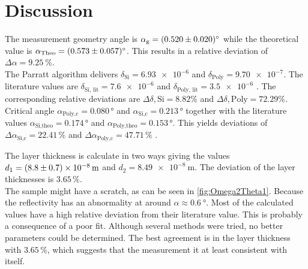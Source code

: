 \section{Discussion}
\label{sec:Diskussion}


The measurement geometry angle is $\alpha_\text{g} = \SI{0.520 \pm 0.020}{\degree}$ while the theoretical value is $\alpha_\text{Theo}  = \SI{0.573 \pm 0.057}{\degree}$.
This results in a relative deviation of $\Delta\alpha = \SI{9.25}{\%}$.\\
The Parratt algorithm delivers $\delta_{\text{Si}}   =  \num{6.93e-6}$ and $\delta_\text{Poly}  =  \num{9.70e-7}$.
The literature values are $\delta_{\text{Si, lit}} = \num{7.6e-6}$ and $\delta_{\text{Poly, lit}} = \num{3.5e-6}$ \cite{v44}.
The corresponding relative deviations are $\Delta{\delta, \text{Si}} = \num{8.82}{\%}$ and $\Delta{\delta, \text{Poly}} = \num{72.29}{\%}$.\\
Critical angle $\alpha_{\text{Poly}, \text{c}} = 0.080 \, \unit{\degree}$ and $\alpha_{\text{Si}, \text{c}} = 0.213\, \unit{\degree}$ together with the literature values 
$\alpha_{\text{Si}, \text{theo}} = 0.174 \, \unit{\degree}$ and $\alpha_{\text{Poly}, \text{theo}} = 0.153 \, \unit{\degree}$.
This yields deviations of $\Delta{\alpha_{\text{Si}, \text{c}}} = 22.41\,\%$ and $\Delta{\alpha_{\text{Poly}, \text{c}}} = 47.71\,\%$ .


The layer thickness is calculate in two ways giving the values $d_1 = \SI{8.8 \pm 0.7e-08}{\meter}$ and $d_2 = \SI{8.49e-8}{\meter}$.
The deviation of the layer thicknesses is $3.65\, \%$.\\

The sample might have a scratch, as can be seen in \autoref{fig:Omega2Theta1}. Because the reflectivity has an abnormality at around $\alpha \approx \SI{0.6}{\degree}$.
Most of the calculated values have a high relative deviation from their literature value. This is probably a consequence of a poor fit.
Although several methods were tried, no better parameters could be determined. The best agreement is in the layer thickness with $3.65\, \%$,
which suggests that the measurement it at least consistent with itself.
